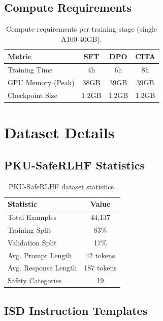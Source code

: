 \subsection{Compute Requirements}

\begin{table}[H]
\centering
\small
\begin{tabular}{@{}lccc@{}}
\toprule
\textbf{Metric} & \textbf{SFT} & \textbf{DPO} & \textbf{CITA} \\
\midrule
Training Time & 4h & 6h & 8h \\
GPU Memory (Peak) & 38GB & 39GB & 39GB \\
Checkpoint Size & 1.2GB & 1.2GB & 1.2GB \\
\bottomrule
\end{tabular}
\caption{Compute requirements per training stage (single A100-40GB).}
\label{tab:compute}
\end{table}

\section{Dataset Details}
\label{sec:appendix_dataset}

\subsection{PKU-SafeRLHF Statistics}

\begin{table}[H]
\centering
\small
\begin{tabular}{@{}lc@{}}
\toprule
\textbf{Statistic} & \textbf{Value} \\
\midrule
Total Examples & 44,137 \\
Training Split & 83\% \\
Validation Split & 17\% \\
Avg. Prompt Length & 42 tokens \\
Avg. Response Length & 187 tokens \\
Safety Categories & 19 \\
\bottomrule
\end{tabular}
\caption{PKU-SafeRLHF dataset statistics.}
\label{tab:pku_stats}
\end{table}

\subsection{ISD Instruction Templates}

